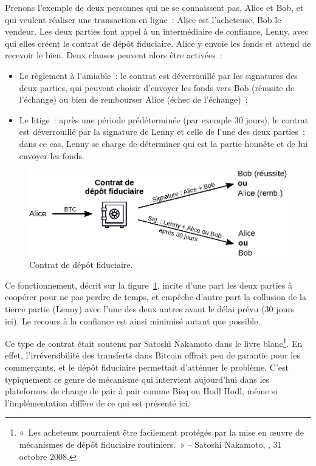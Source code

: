 Prenons l'exemple de deux personnes qui ne se connaissent pas, Alice et Bob, et qui veulent réaliser une transaction en ligne~: Alice est l'acheteuse, Bob le vendeur. Les deux parties font appel à un intermédiaire de confiance, Lenny, avec qui elles créent le contrat de dépôt fiduciaire. Alice y envoie les fonds et attend de recevoir le bien. Deux clauses peuvent alors être activées~:

\begin{itemize}
\item Le règlement à l'amiable~: le contrat est déverrouillé par les signatures des deux parties, qui peuvent choisir d'envoyer les fonds vers Bob (réussite de l'échange) ou bien de rembourser Alice (échec de l'échange)~;
\item Le litige~: après une période prédéterminée (par exemple 30 jours), le contrat est déverrouillé par la signature de Lenny et celle de l'une des deux parties~; dans ce cas, Lenny se charge de déterminer qui est la partie honnête et de lui envoyer les fonds.
\end{itemize}

\begin{figure}[ht]
  \centering
  \includegraphics[scale=0.9]{img/escrow-contract.eps}
  \caption{Contrat de dépôt fiduciaire.}
  \label{fig:escrow-contract}
\end{figure}

Ce fonctionnement, décrit sur la figure~\ref{fig:escrow-contract}, incite d'une part les deux parties à coopérer pour ne pas perdre de temps, et empêche d'autre part la collusion de la tierce partie (Lenny) avec l'une des deux autres avant le délai prévu (30 jours ici). Le recours à la confiance est ainsi minimisé autant que possible.

Ce type de contrat était soutenu par Satoshi Nakamoto dans le livre blanc\footnote{«~Les acheteurs pourraient être facilement protégés par la mise en œuvre de mécanismes de dépôt fiduciaire routiniers.~» -- Satoshi Nakamoto, , 31 octobre 2008.}. En effet, l'irréversibilité des transferts dans Bitcoin offrait peu de garantie pour les commerçants, et le dépôt fiduciaire permettait d'atténuer le problème. C'est typiquement ce genre de mécanisme qui intervient aujourd'hui dans les plateformes de change de pair à pair comme Bisq ou Hodl Hodl, même si l'implémentation diffère de ce qui est présenté ici.

